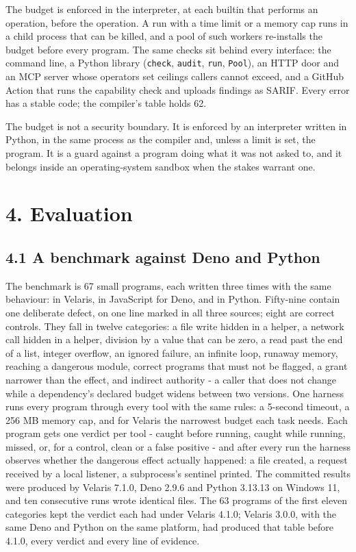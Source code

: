 \documentclass[
]{article}
\begin{document}
The budget is enforced in the interpreter, at each builtin that performs
an operation, before the operation. A run with a time limit or a memory
cap runs in a child process that can be killed, and a pool of such
workers re-installs the budget before every program. The same checks sit
behind every interface: the command line, a Python library
(\texttt{check}, \texttt{audit}, \texttt{run}, \texttt{Pool}), an HTTP
door and an MCP server whose operators set ceilings callers cannot
exceed, and a GitHub Action that runs the capability check and uploads
findings as SARIF. Every error has a stable code; the compiler's table
holds 62.

The budget is not a security boundary. It is enforced by an interpreter
written in Python, in the same process as the compiler and, unless a
limit is set, the program. It is a guard against a program doing what it
was not asked to, and it belongs inside an operating-system sandbox when
the stakes warrant one.

\section{4. Evaluation}\label{evaluation}

\subsection{4.1 A benchmark against Deno and
Python}\label{a-benchmark-against-deno-and-python}

The benchmark is 67 small programs, each written three times with the
same behaviour: in Velaris, in JavaScript for Deno, and in Python.
Fifty-nine contain one deliberate defect, on one line marked in all
three sources; eight are correct controls. They fall in twelve
categories: a file write hidden in a helper, a network call hidden in a
helper, division by a value that can be zero, a read past the end of a
list, integer overflow, an ignored failure, an infinite loop, runaway
memory, reaching a dangerous module, correct programs that must not be
flagged, a grant narrower than the effect, and indirect authority - a
caller that does not change while a dependency's declared budget widens
between two versions. One harness runs every program through every tool
with the same rules: a 5-second timeout, a 256 MB memory cap, and for
Velaris the narrowest budget each task needs. Each program gets one
verdict per tool - caught before running, caught while running, missed,
or, for a control, clean or a false positive - and after every run the
harness observes whether the dangerous effect actually happened: a file
created, a request received by a local listener, a subprocess's sentinel
printed. The committed results were produced by Velaris 7.1.0, Deno
2.9.6 and Python 3.13.13 on Windows 11, and ten consecutive runs wrote
identical files. The 63 programs of the first eleven categories kept the
verdict each had under Velaris 4.1.0; Velaris 3.0.0, with the same Deno
and Python on the same platform, had produced that table before 4.1.0,
every verdict and every line of evidence.
\end{document}
